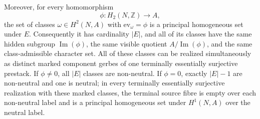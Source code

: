 \begin{theorem}
Moreover, for every homomorphism
\[
\phi:H_2(N,\mathbb Z)\longrightarrow A,
\]
the set of classes $\omega\in H^2(N,A)$ with
$\mathrm{ev}_{\omega}=\phi$ is a principal homogeneous set under $E$.
Consequently it has cardinality $|E|$, and all of its classes have the same
hidden subgroup $\operatorname{Im}(\phi)$, the same visible quotient
$A/\operatorname{Im}(\phi)$, and the same class-admissible character set.
All of these classes can be realized simultaneously as distinct marked
component gerbes of one terminally essentially surjective prestack. If
$\phi\ne0$, all $|E|$ classes are non-neutral. If $\phi=0$, exactly
$|E|-1$ are non-neutral and one is neutral; in every terminally essentially
surjective realization with these marked classes, the terminal source fibre
is empty over each non-neutral label and is a principal homogeneous set under
$H^1(N,A)$ over the neutral label.
\end{theorem}

